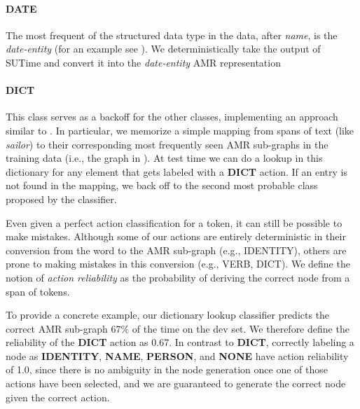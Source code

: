 \documentclass[11pt]{article}
\newcommand\w[1]{\textit{#1}} %
\newcommand\n[1]{\textit{#1}} %
\begin{document}
\paragraph{DATE} The most frequent of the structured data type in the data, after \n{name}, is the \n{date-entity} (for an example see ).
We deterministically take the output of SUTime \cite{2012chang-temporal}
  and convert it into the \n{date-entity} AMR representation

\paragraph{DICT} This class serves as a backoff for the other classes, implementing
an approach similar to .
In particular, we memorize a simple mapping from spans of text
  (like \w{sailor}) to their corresponding most frequently seen AMR sub-graphs 
  in the training data (i.e., the graph in ).
At test time we can do a lookup in this dictionary for any element that gets 
  labeled with a \textbf{DICT} action. 
If an entry is not found in the mapping, we back off to the second most probable
  class proposed by the classifier.


%
%

Even given a perfect action classification for a token, it can still be possible to
  make mistakes.
Although some of our actions are entirely deterministic in their conversion
  from the word to the AMR sub-graph (e.g., IDENTITY), others are prone to
  making mistakes in this conversion (e.g., VERB, DICT).
We define the 
  notion of \textit{action reliability} as the probability of deriving the correct node from a span of tokens.

To provide a concrete example, our dictionary lookup classifier predicts the correct
  AMR sub-graph 67\% of the time on the dev set.
We therefore define the reliability of the \textbf{DICT} action as 0.67.
In contrast to \textbf{DICT}, correctly labeling a node as \textbf{IDENTITY}, \textbf{NAME}, \textbf{PERSON}, and \textbf{NONE} have 
  action reliability of 1.0, since there is no ambiguity in the node generation 
  once one of those actions have been selected, 
  and we are guaranteed to generate the correct node given the correct action.
\end{document}
